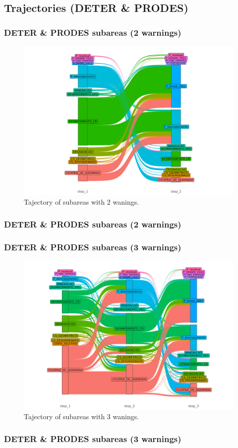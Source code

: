 \documentclass[aspectratio=169]{beamer}
\begin{document}
\subsection{Trajectories (DETER \& PRODES)} 

\begin{frame}
    \frametitle{DETER \& PRODES subareas (2 warnings)}
    \begin{figure}[h] 
        \includegraphics[width=0.65\linewidth]
        {./figures/plot_deter_prodes_subarea_trajectory_2.png}
        \caption{Tajectory of subareas with 2 wanings.}
        \label{fig:deter_prodes_subarea_trajectory_2}
    \end{figure}
\end{frame}
\begin{frame}[allowframebreaks]
    \frametitle{DETER \& PRODES subareas (2 warnings)}
    
\end{frame}

\begin{frame}
    \frametitle{DETER \& PRODES subareas (3 warnings)}
    \begin{figure}[h] 
        \includegraphics[width=0.65\linewidth]
        {./figures/plot_deter_prodes_subarea_trajectory_3.png}
        \caption{Tajectory of subareas with 3 wanings.}
        \label{fig:deter_prodes_subarea_trajectory_3}
    \end{figure}
\end{frame}
\begin{frame}[allowframebreaks]
    \frametitle{DETER \& PRODES subareas (3 warnings)}
    
\end{frame}
\end{document}
